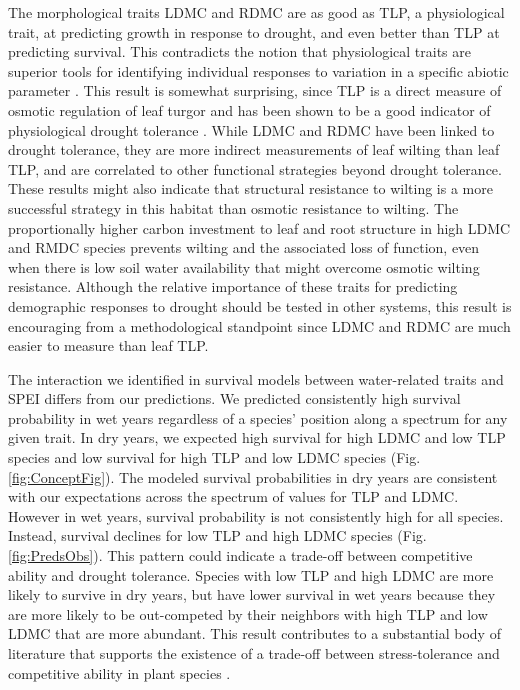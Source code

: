 \documentclass[12pt, letterpaper]{article}
\begin{document}
  The morphological traits LDMC and RDMC are as good as TLP, a physiological trait, at predicting growth in response to drought, and even better than TLP at predicting survival. This contradicts the notion that physiological traits are superior tools for identifying individual responses to variation in a specific abiotic parameter \citep{Volaire2018}. This result is somewhat surprising, since TLP is a direct measure of osmotic regulation of leaf turgor and has been shown to be a good indicator of physiological drought tolerance \citep{Bartlett2012}. While LDMC and RDMC have been linked to drought tolerance, they are more indirect measurements of leaf wilting than leaf TLP, and are correlated to other functional strategies beyond drought tolerance. These results might also indicate that structural resistance to wilting is a more successful strategy in this habitat than osmotic resistance to wilting. The proportionally higher carbon investment to leaf and root structure in high LDMC and RMDC species prevents wilting and the associated loss of function, even when there is low soil water availability that might overcome osmotic wilting resistance. Although the relative importance of these traits for predicting demographic responses to drought should be tested in other systems, this result is encouraging from a methodological standpoint since LDMC and RDMC are much easier to measure than leaf TLP. 

 The interaction we identified in survival models between water-related traits and SPEI differs from our predictions. We predicted consistently high survival probability in wet years regardless of a species' position along a spectrum for any given trait. In dry years, we expected high survival for high LDMC and low TLP species and low survival for high TLP and low LDMC species (Fig. \ref{fig:ConceptFig}). The modeled survival probabilities in dry years are consistent with our expectations across the spectrum of values for TLP and LDMC. However in wet years, survival probability is not consistently high for all species. Instead, survival declines for low TLP and high LDMC species (Fig. \ref{fig:PredsObs}). This pattern could indicate a trade-off between competitive ability and drought tolerance. Species with low TLP and high LDMC are more likely to survive in dry years, but have lower survival in wet years because they are more likely to be out-competed by their neighbors with high TLP and low LDMC that are more abundant. This result contributes to a substantial body of literature that supports the existence of a trade-off between stress-tolerance and competitive ability in plant species \citep{Grime1979, Grime1997, Craine2007, Volaire2018}. 
\end{document}
